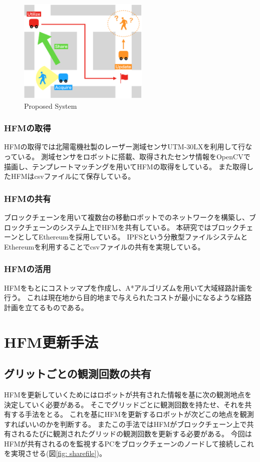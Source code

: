 \documentclass{jsarticle}
\begin{document}
\begin{figure}[tbh]
 \centering
  \includegraphics[height=50mm]{fig/proposedsystem.eps}
  \vspace*{-4mm}
  \caption{Proposed System}
  \label{fig: proposedsystem}
\end{figure}

\subsubsection{HFMの取得}
HFMの取得では北陽電機社製のレーザー測域センサUTM-30LXを利用して行なっている。
測域センサをロボットに搭載、取得されたセンサ情報をOpenCVで描画し、テンプレートマッチングを用いてHFMの取得をしている。
また取得したHFMはcsvファイルにて保存している。

\subsubsection{HFMの共有}
ブロックチェーンを用いて複数台の移動ロボットでのネットワークを構築し、ブロックチェーンのシステム上でHFMを共有している。
本研究ではブロックチェーンとしてEthereumを採用している。
IPFSという分散型ファイルシステムとEthereumを利用することでcsvファイルの共有を実現している。


\subsubsection{HFMの活用}
HFMをもとにコストッマプを作成し、A*アルゴリズムを用いて大域経路計画を行う。
これは現在地から目的地まで与えられたコストが最小になるような経路計画を立てるものである。



\section{HFM更新手法}
\subsection{グリットごとの観測回数の共有}
HFMを更新していくためにはロボットが共有された情報を基に次の観測地点を決定していく必要がある。
そこでグリッドごとに観測回数を持たせ、それを共有する手法をとる。
これを基にHFMを更新するロボットが次どこの地点を観測すればいいのかを判断する。
またこの手法ではHFMがブロックチェーン上で共有されるたびに観測されたグリッドの観測回数を更新する必要がある。
今回はHFMが共有されるのを監視するPCをブロックチェーンのノードして接続しこれを実現させる(図\ref{fig: sharefile})。
\end{document}

